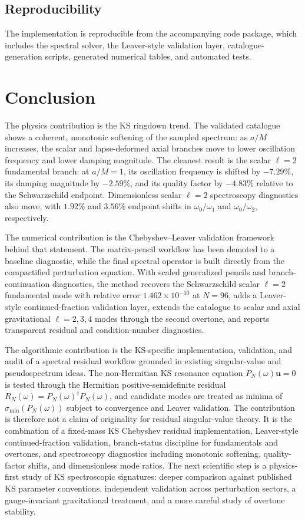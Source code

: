 \documentclass[10pt,letterpaper,twocolumn]{article}
\begin{document}
\subsection{Reproducibility}

The implementation is reproducible from the accompanying code package, which includes the spectral solver, the Leaver-style validation layer, catalogue-generation scripts, generated numerical tables, and automated tests.

\section{Conclusion}

The physics contribution is the KS ringdown trend. The validated catalogue shows a coherent, monotonic softening of the sampled spectrum: as \(a/M\) increases, the scalar and lapse-deformed axial branches move to lower oscillation frequency and lower damping magnitude. The cleanest result is the scalar \(\ell=2\) fundamental branch: at \(a/M=1\), its oscillation frequency is shifted by \(-7.29\%\), its damping magnitude by \(-2.59\%\), and its quality factor by \(-4.83\%\) relative to the Schwarzschild endpoint. Dimensionless scalar \(\ell=2\) spectroscopy diagnostics also move, with \(1.92\%\) and \(3.56\%\) endpoint shifts in \(\omega_0/\omega_1\) and \(\omega_0/\omega_2\), respectively.

The numerical contribution is the Chebyshev--Leaver validation framework behind that statement. The matrix-pencil workflow has been demoted to a baseline diagnostic, while the final spectral operator is built directly from the compactified perturbation equation. With scaled generalized pencils and branch-continuation diagnostics, the method recovers the Schwarzschild scalar \(\ell=2\) fundamental mode with relative error \(1.462\times10^{-10}\) at \(N=96\), adds a Leaver-style continued-fraction validation layer, extends the catalogue to scalar and axial gravitational \(\ell=2,3,4\) modes through the second overtone, and reports transparent residual and condition-number diagnostics.

The algorithmic contribution is the KS-specific implementation, validation, and audit of a spectral residual workflow grounded in existing singular-value and pseudospectrum ideas. The non-Hermitian KS resonance equation \(P_N(\omega)\bm{u}=0\) is tested through the Hermitian positive-semidefinite residual \(R_N(\omega)=P_N(\omega)^\dagger P_N(\omega)\), and candidate modes are treated as minima of \(\sigma_{\min}(P_N(\omega))\) subject to convergence and Leaver validation. The contribution is therefore not a claim of originality for residual singular-value theory. It is the combination of a fixed-mass KS Chebyshev residual implementation, Leaver-style continued-fraction validation, branch-status discipline for fundamentals and overtones, and spectroscopy diagnostics including monotonic softening, quality-factor shifts, and dimensionless mode ratios. The next scientific step is a physics-first study of KS spectroscopic signatures: deeper comparison against published KS parameter conventions, independent validation across perturbation sectors, a gauge-invariant gravitational treatment, and a more careful study of overtone stability.
\end{document}
